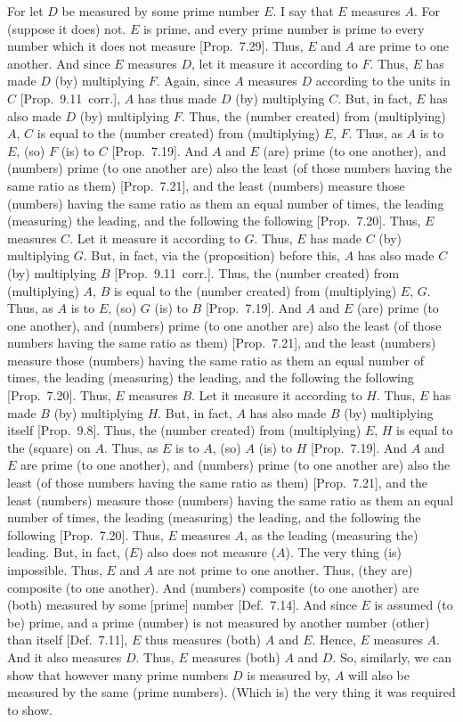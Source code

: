 \begin{Parallel}{}{}
{For let $D$ be measured by some prime number $E$. I say that $E$ measures $A$. For (suppose it does) not. $E$ is prime, and every prime number is prime to
every number which it does not measure [Prop.~7.29]. Thus, $E$ and $A$ are prime to one another. And since $E$ measures $D$, let it measure it according to $F$. 
Thus, $E$ has made $D$ (by) multiplying $F$.  Again, since $A$ measures $D$ according to the units in $C$ [Prop.~9.11~corr.],
$A$ has thus made $D$ (by) multiplying $C$. But, in fact, $E$ has also
made $D$ (by) multiplying $F$. Thus, the (number created) from (multiplying)
$A$, $C$ is equal to  the (number created) from (multiplying) $E$, $F$.
Thus, as $A$ is to $E$, (so) $F$ (is) to $C$ [Prop.~7.19]. And $A$ and $E$ (are)  prime (to one another), and (numbers) prime (to one another are) also the least (of those
numbers having the same ratio as them) [Prop.~7.21],
and the least (numbers) measure those (numbers) having the same ratio as them an equal number of times, the leading (measuring) the leading, and the
following the following [Prop.~7.20]. Thus, $E$
measures $C$. Let it measure it according to $G$. Thus, $E$ has made $C$
(by) multiplying $G$. But, in fact, via the (proposition) before this, $A$
has also made $C$ (by) multiplying $B$ [Prop.~9.11~corr.].
 Thus, the (number created) from (multiplying) $A$, $B$ is equal to the
 (number created) from (multiplying) $E$, $G$. Thus, as $A$ is to $E$, (so) $G$ (is) to $B$ [Prop.~7.19]. And $A$ and $E$
 (are) prime (to one another), and (numbers) prime (to one another are) also the least (of those
numbers having the same ratio as them) [Prop.~7.21],
and the least (numbers) measure those (numbers) having the same ratio as them an equal number of times, the leading (measuring) the leading, and the
following the following [Prop.~7.20]. Thus, $E$
measures $B$. Let it measure it according to $H$. Thus, $E$ has made $B$ (by) multiplying $H$. But, in fact, $A$ has also made $B$
(by) multiplying itself [Prop.~9.8].  Thus, the (number created) from (multiplying) $E$, $H$ is equal to the (square) on $A$.
Thus, as $E$ is to $A$, (so) $A$ (is) to $H$ [Prop.~7.19]. And $A$ and $E$
 are prime (to one another), and (numbers) prime (to one another are) also the least (of those
numbers having the same ratio as them) [Prop.~7.21],
and the least (numbers) measure those (numbers) having the same ratio  as them an equal number of times, the leading (measuring) the leading, and the
following the following
[Prop.~7.20]. Thus, $E$
measures $A$, as the leading (measuring the) leading. But, in fact, 
($E$) also does not measure ($A$). The very thing (is) impossible. Thus,
$E$ and $A$ are not prime to one another. Thus, (they are) composite (to one another). And (numbers) composite (to one another) are (both) measured
by some [prime] number [Def.~7.14]. And since $E$
is assumed (to be) prime, and a prime (number) is not measured by  another number (other) than itself
[Def.~7.11], $E$ thus measures (both) $A$ and $E$. Hence, $E$ measures $A$. And it also measures $D$. Thus, $E$ measures (both) $A$ and $D$. So, similarly, we can show that however many prime
numbers $D$ is measured by, $A$ will also be measured by the same
(prime numbers). (Which is) the very thing it was required to show.}
\end{Parallel}


